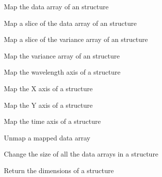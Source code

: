 \begin{mansectionroutines}
     Map the data array of an {} structure

     Map a slice of the data array of an {} structure

     Map a slice of the variance array of an {} structure

     Map the variance array of an {} structure

     Map the wavelength axis of a {} structure

     Map the X axis of a {} structure

     Map the Y axis of a {} structure

     Map the time axis of a {} structure

     Unmap a mapped data array

\end{mansectionroutines}
\begin{mansectionroutines}
     Change the size of all the data arrays in a structure

     Return the dimensions of a {} structure

\end{mansectionroutines}
